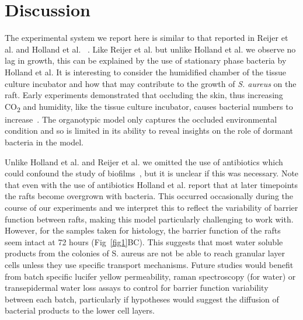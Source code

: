 \documentclass[10pt,letterpaper]{article}
\begin{document}
\section*{Discussion}

The experimental system we report here is similar to that reported in Reijer et al. and Holland et al. ~\cite{reijer_detection_2016,holland_microbial_2008}.
Like Reijer et al. but unlike Holland et al. we observe no lag in growth, this can be explained by the use of stationary phase bacteria by Holland et al.
It is interesting to consider the humidified chamber of the tissue culture incubator and how that may contribute to the growth of \textit{S. aureus} on the raft.
Early experiments demonstrated that occluding the skin, thus increasing CO\textsubscript{2} and humidity, like the tissue culture incubator, causes bacterial numbers to increase~\cite{lovell_skin_1945-1}.
The organotypic model only captures the occluded environmental condition and so is limited in its ability to reveal insights on the role of dormant bacteria in the model.

Unlike Holland et al. and Reijer et al. we omitted the use of antibiotics which could confound the study of biofilms~\cite{kaplan_low_2012}, but it is unclear if this was necessary.
Note that even with the use of antibiotics Holland et al. report that at later timepoints the rafts become overgrown with bacteria.
This occurred occasionally during the course of our experiments and we interpret this to reflect the variability of barrier function between rafts, making this model particularly challenging to work with.
However, for the samples taken for histology, the barrier function of the rafts seem intact at 72 hours (Fig~\ref{fig1}BC).
This suggests that most water soluble products from the colonies of S. aureus are not be able to reach granular layer cells unless they use specific transport mechanisms.
Future studies would benefit from batch specific lucifer yellow permeability, raman spectroscopy (for water) or transepidermal water loss assays to control for barrier function variability between each batch, particularly if hypotheses would suggest the diffusion of bacterial products to the lower cell layers.
\end{document}
